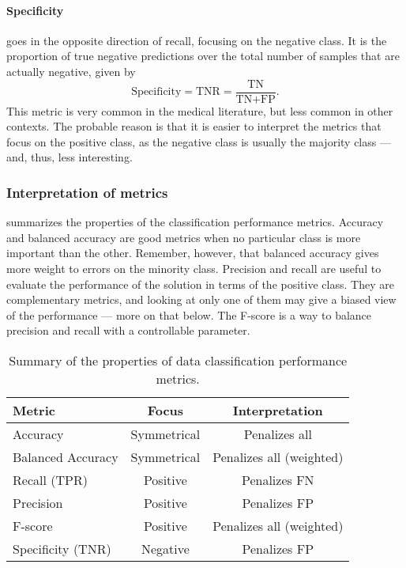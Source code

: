 \paragraph{Specificity} goes in the opposite direction of recall, focusing on the negative
class.  It is the proportion of true negative predictions over the total
number of samples that are actually negative, given by
\begin{equation*}
  \text{Specificity} = \text{TNR} = \frac{\text{TN}}{\text{TN} + \text{FP}}\text{.}
\end{equation*}
This metric is very common in the medical literature, but less common in other contexts.
The probable reason is that it is easier to interpret the metrics that focus on the
positive class, as the negative class is usually the majority class --- and, thus, less
interesting.

\subsubsection{Interpretation of metrics}

 summarizes the properties of the classification
performance metrics.  Accuracy and balanced accuracy are good metrics when no particular
class is more important than the other.  Remember, however, that balanced accuracy gives
more weight to errors on the minority class.  Precision and recall are useful to evaluate
the performance of the solution in terms of the positive class.  They are complementary metrics,
and looking at only one of them may give a biased view of the performance --- more on that
below.  The F-score is a way to balance precision and recall with a controllable parameter.

\begin{table}\caption{Summary of the properties of data classification performance metrics.}\label{tab:classification-metrics}
  \centering
  \begin{tabular}{l c c}
    \toprule
    \textbf{Metric} & \textbf{Focus} & \textbf{Interpretation} \\
    \midrule
    Accuracy           & Symmetrical & Penalizes all \\
    Balanced Accuracy  & Symmetrical & Penalizes all (weighted) \\
    Recall (TPR)       & Positive & Penalizes FN \\
    Precision          & Positive & Penalizes FP \\
    F-score            & Positive & Penalizes all (weighted) \\
    Specificity (TNR)  & Negative & Penalizes FP \\
    \bottomrule
  \end{tabular}
\end{table}

